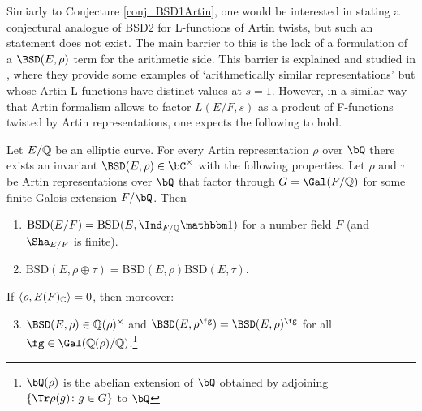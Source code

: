 Simiarly to Conjecture \ref{conj_BSD1Artin}, one would be interested in stating a conjectural analogue of BSD2 for L-functions of Artin twists, but such an statement does not exist. The main barrier to this is the lack of a formulation of a $\BSD(E,\rho)$ term for the arithmetic side. This barrier is explained and studied in \cite[\S4]{DEW1}, where they provide some examples of `arithmetically similar representations' but whose Artin L-functions have distinct values at $s=1$. However, in a similar way that Artin formalism allows to factor $L(E/F,s)$ as a prodcut of F-functions twisted by Artin representations, one expects the following to hold.

\begin{conj}{\cite[Conjecture 4]{DEW1}}
    Let $E/\mathbb{Q}$ be an elliptic curve. 
    For every Artin representation $\rho$ over $\bQ$ there exists an invariant $\BSD(E, \rho) \in \bC^{\times}$ with the following properties. 
    Let $\rho$ and $\tau$ be Artin representations over $\bQ$ that factor through $G = \Gal(F/\QQ)$ for some finite Galois extension $F / \bQ$. Then 
    \begin{enumerate}[label={\bfseries C\arabic*.}]
        \setlength\itemsep{0em}
        \item $\mathrm{BSD}(E/F)=\mathrm{BSD}(E,\Ind_{F/\QQ}\trivial)$ for a number field $F$ (and $\Sha_{E/F}$ is finite).
        \item $\mathrm{BSD}(E,\rho\oplus\tau)=\mathrm{BSD}(E,\rho)\mathrm{BSD}(E,\tau)$.
    \end{enumerate}       
        If $\langle\rho,E(F)_{\mathbb{C}}\rangle=0$, then moreover:
    \begin{enumerate}[label={\bfseries C\arabic*.}]
        \setcounter{enumi}{2}
       \item $\BSD(E,\rho)\in\QQ(\rho)^{\times}$ and $\BSD(E,\rho^{\fg})=\BSD(E,\rho)^{\fg}$ for all $\fg\in\Gal(\QQ(\rho)/\QQ)$.\footnote{$\bQ(\rho)$ is the abelian extension of $\bQ$ obtained by adjoining $\{\Tr \rho (g) \colon g \in G \}$ to $\bQ$}
    \end{enumerate}
\end{conj}

